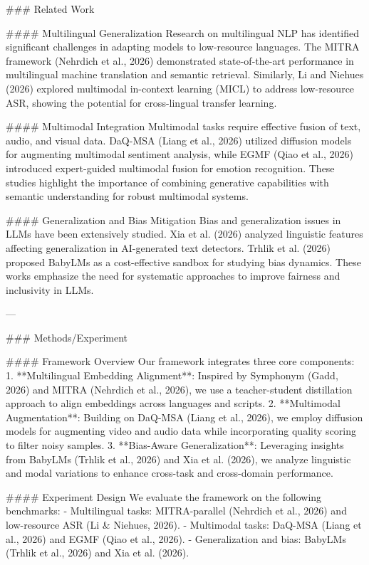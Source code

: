 ### Related Work

#### Multilingual Generalization
Research on multilingual NLP has identified significant challenges in adapting models to low-resource languages. The MITRA framework (Nehrdich et al., 2026) demonstrated state-of-the-art performance in multilingual machine translation and semantic retrieval. Similarly, Li and Niehues (2026) explored multimodal in-context learning (MICL) to address low-resource ASR, showing the potential for cross-lingual transfer learning.

#### Multimodal Integration
Multimodal tasks require effective fusion of text, audio, and visual data. DaQ-MSA (Liang et al., 2026) utilized diffusion models for augmenting multimodal sentiment analysis, while EGMF (Qiao et al., 2026) introduced expert-guided multimodal fusion for emotion recognition. These studies highlight the importance of combining generative capabilities with semantic understanding for robust multimodal systems.

#### Generalization and Bias Mitigation
Bias and generalization issues in LLMs have been extensively studied. Xia et al. (2026) analyzed linguistic features affecting generalization in AI-generated text detectors. Trhlik et al. (2026) proposed BabyLMs as a cost-effective sandbox for studying bias dynamics. These works emphasize the need for systematic approaches to improve fairness and inclusivity in LLMs.

---

### Methods/Experiment

#### Framework Overview
Our framework integrates three core components:
1. **Multilingual Embedding Alignment**: Inspired by Symphonym (Gadd, 2026) and MITRA (Nehrdich et al., 2026), we use a teacher-student distillation approach to align embeddings across languages and scripts.
2. **Multimodal Augmentation**: Building on DaQ-MSA (Liang et al., 2026), we employ diffusion models for augmenting video and audio data while incorporating quality scoring to filter noisy samples.
3. **Bias-Aware Generalization**: Leveraging insights from BabyLMs (Trhlik et al., 2026) and Xia et al. (2026), we analyze linguistic and modal variations to enhance cross-task and cross-domain performance.

#### Experiment Design
We evaluate the framework on the following benchmarks:
- Multilingual tasks: MITRA-parallel (Nehrdich et al., 2026) and low-resource ASR (Li & Niehues, 2026).
- Multimodal tasks: DaQ-MSA (Liang et al., 2026) and EGMF (Qiao et al., 2026).
- Generalization and bias: BabyLMs (Trhlik et al., 2026) and Xia et al. (2026).

